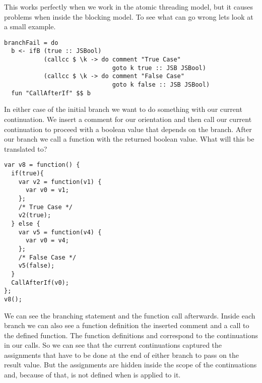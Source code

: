 This works perfectly when we work in the atomic threading model,
but it causes problems when inside the blocking model. To 
see what can go wrong lets look at a small example.
\begin{verbatim}
branchFail = do
  b <- ifB (true :: JSBool)
           (callcc $ \k -> do comment "True Case"
                              goto k true :: JSB JSBool)
           (callcc $ \k -> do comment "False Case"
                              goto k false :: JSB JSBool)
  fun "CallAfterIf" $$ b
\end{verbatim}
In either case of the initial branch we want to do something
with our current continuation. We insert a comment for 
our orientation and then call our current continuation to 
proceed with a boolean value that depends on the branch.
After our branch we call a function with the returned boolean value.
What will this be translated to?
\begin{verbatim}
var v8 = function() {
  if(true){
    var v2 = function(v1) {
      var v0 = v1;
    };
    /* True Case */
    v2(true);
  } else {
    var v5 = function(v4) {
      var v0 = v4;
    };
    /* False Case */
    v5(false);
  }
  CallAfterIf(v0);
};
v8();
\end{verbatim}
We can see the branching statement and the function call afterwards.
Inside each branch we can also see a function definition the inserted 
comment and a call to the defined function. The function definitions 
 and  correspond to the continuations  in 
our  calls. So we can see that the current continuations 
captured the assignments that have to be done at the end of either branch 
to pass on the result value. But the assignments are hidden inside 
the scope of the continuations and, because of that,  is 
not defined when  is applied to it.

